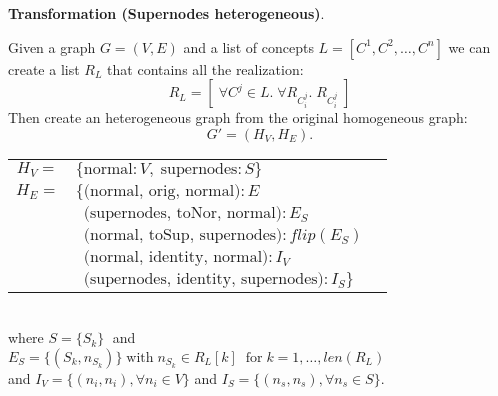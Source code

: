 \documentclass[twoside,11pt]{article}
\begin{document}
\noindent
{\bf Transformation (Supernodes heterogeneous)}.
{
    Given a graph \( G = (V,E) \) and a list of concepts \( L = [C^1, C^2, \ldots, C^n] \) we can create a list \( R_{L} \) that contains all the realization:
\[
    R_L = [ \; \forall C^j \in L.\;\forall R_{C_i^j}. \; R_{C_i^j} \; ]
\]
Then create an heterogeneous graph from the original homogeneous graph:\[
    G'=(H_V, H_E)
.\]
\begin{tabular}{cll}
    \( H_V = \) &  \( \{\textrm{normal}:V,\; \textrm{supernodes}:S\} \) \\
    \( H_E = \) &  \( \{\textrm{(normal, orig, normal)} : E \) \\
              & \( \,\,\, \textrm{(supernodes, toNor, normal)} : E_S \) \\
              & \( \,\,\, \textrm{(normal, toSup, supernodes)} : flip(E_S) \) \\
              & \( \,\,\, \textrm{(normal, identity, normal)} : I_V \) \\
              & \( \,\,\, \textrm{(supernodes, identity, supernodes)} : I_S \}\) \\
\end{tabular}\\

\noindent
where \( S = \{S_{k} \} \; \) and \( E_S = \{ (S_k, n_{S_k})  \} \; \textrm{with} \; n_{S_k} \in R_L[k] \;\; \textrm{for} \; k = 1, \ldots, len(R_L) \) \\
and \( I_V = \{(n_i, n_i), \forall n_i \in V\} \) and \( I_S = \{(n_s, n_s), \forall n_s \in S \} \).
}\\
\end{document}
